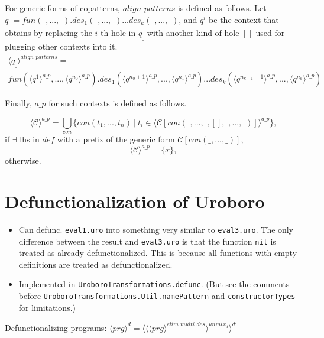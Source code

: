 \documentclass[11pt]{article} %
\begin{document}
For generic forms of copatterns, $align\_patterns$ is defined as follows. Let $q_\_ = fun(\_, ..., \_).des_1(\_, ..., \_)...des_k(\_, ..., \_)$, and $q^i_\_$ be the context that obtains by replacing the $i$-th hole in $q_\_$ with another kind of hole $[]$ used for plugging other contexts into it.
\begin{multline*}
\langle q_\_ \rangle^{align\_patterns} = \\
fun(\langle q^1_\_ \rangle^{a\_p}, ..., \langle q^{n_0}_\_ \rangle^{a\_p}).des_1(\langle q^{n_0 + 1}_\_ \rangle^{a\_p}, ..., \langle q^{n_1}_\_ \rangle^{a\_p})...des_k(\langle q^{n_{k-1} + 1}_\_ \rangle^{a\_p}, ..., \langle q^{n_k}_\_ \rangle^{a\_p})
\end{multline*}

Finally, $a\_p$ for such contexts is defined as follows.

\begin{equation*}
\langle \mathcal{C} \rangle^{a\_p} = \bigcup_{con} \{con(t_1, ..., t_n) ~ | ~ t_i \in \langle \mathcal{C}[con(\_, ..., \_, [], \_, ..., \_)] \rangle^{a\_p} \},
\end{equation*}
if $\exists$ lhs in $def$ with a prefix of the generic form $\mathcal{C}[con(\_, ..., \_)]$,
\begin{equation*}
\langle \mathcal{C} \rangle^{a\_p} = \{x\},
\end{equation*}
otherwise.

\section{Defunctionalization of Uroboro}

\begin{itemize}
\item Can defunc. \texttt{eval1.uro} into something very similar to \texttt{eval3.uro}. The only difference between the result and \texttt{eval3.uro} is that the function \texttt{nil} is treated as already defunctionalized. This is because all functions with empty definitions are treated as defunctionalized.

\item Implemented in \texttt{UroboroTransformations.defunc}. (But see the comments before \texttt{UroboroTransformations.Util.namePattern} and \texttt{constructorTypes} for limitations.)

\end{itemize}

Defunctionalizing programs: $\langle prg \rangle^d = \langle \langle \langle prg \rangle^{elim\_multi\_des} \rangle^{unmix_d} \rangle^{d'}$
\end{document}
